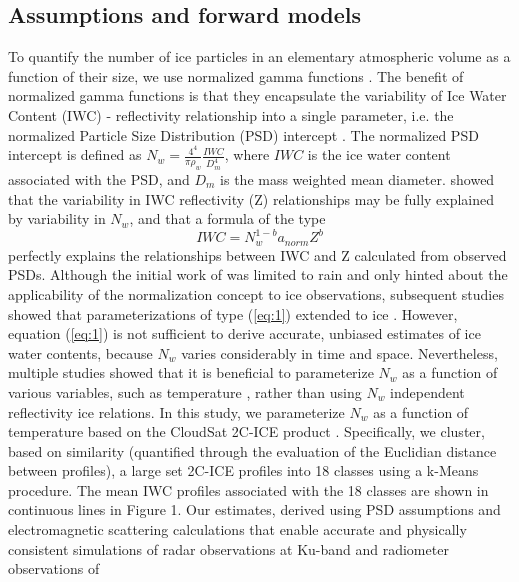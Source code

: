 \documentclass{ametsocV6.1}
\begin{document}
\subsection{Assumptions and forward models}
To quantify the number of ice particles in an elementary atmospheric volume as a function of their size, we use
normalized gamma functions \citep{bringi2003}.  The benefit of normalized gamma functions is that they 
encapsulate the variability of Ice Water Content (IWC) - reflectivity relationship into a single parameter,
i.e. the 
normalized Particle Size Distribution (PSD) intercept \citep{testud2001,bringi2003}. The normalized
PSD intercept is defined as $N_w=\frac {4^4} {\pi \rho_w} \frac {IWC} {D_m^4}$, where $IWC$ is the ice water 
content associated with the PSD, and $D_m$ is the mass weighted mean diameter.  \cite{testud2001} showed 
that the variability in IWC reflectivity (Z) relationships may be fully explained by variability in $N_w$, and 
that a formula of the type
\begin{equation}
IWC=N_w^{1-b}a_{norm} Z^b \label{eq:1}
\end{equation}
perfectly explains the relationships between IWC and Z calculated from observed PSDs. 
Although the initial work of \cite{testud2001} was limited to rain and only hinted about the applicability
of the normalization concept to ice observations, subsequent studies showed that parameterizations
of type (\ref{eq:1}) extended to ice \citep{ferreira2001,delanoe2014}.
However, equation (\ref{eq:1}) is not 
sufficient to derive accurate, unbiased estimates of ice water contents, because $N_w$ varies considerably in 
time and space. Nevertheless, multiple studies showed that it is beneficial to parameterize $N_w$ as a function 
of various variables, such as temperature \citep{hogan2006retrieval, delanoe2008variational,deng2010tropical}, 
rather than using $N_w$ independent reflectivity ice relations.  In this study, we parameterize
$N_w$ as a function of temperature based on the CloudSat 2C-ICE product \citep{deng2010tropical,deng2013evaluation}.  
Specifically, we cluster, based on similarity (quantified through the evaluation of the Euclidian distance between profiles), 
a large set 2C-ICE profiles into 18 classes using a k-Means 
procedure. The mean IWC profiles associated with the 18 classes are shown in continuous lines in Figure 1.  
Our estimates, derived using PSD assumptions and electromagnetic scattering calculations that enable 
accurate and physically consistent simulations of radar observations at Ku-band and radiometer observations of 
\end{document}
